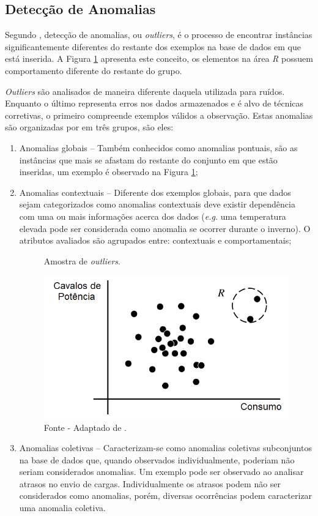 \subsection{Detecção de Anomalias}
\label{subsec:outliers}

Segundo , detecção de anomalias, ou \textit{outliers}, é o processo de encontrar instâncias significantemente diferentes do restante dos exemplos na base de dados em que está inserida. A Figura \ref{fig:outliers} apresenta este conceito, os elementos na área \textit{R} possuem comportamento diferente do restante do grupo.

\textit{Outliers} são analisados de maneira diferente daquela utilizada para ruídos. Enquanto o último representa erros nos dados armazenados e é alvo de técnicas corretivas, o primeiro compreende exemplos válidos a observação. Estas anomalias são organizadas por  em três grupos, são eles:

\begin{enumerate}[label=\roman*.]
    \item Anomalias globais {--} Também conhecidos como anomalias pontuais, são as instâncias que mais se afastam do restante do conjunto em que estão inseridas, um exemplo é observado na Figura \ref{fig:outliers};
    \item Anomalias contextuais {--} Diferente dos exemplos globais, para que dados sejam categorizados como anomalias contextuais deve existir dependência com uma ou mais informações acerca dos dados (\textit{e.g.} uma temperatura elevada pode ser considerada como anomalia se ocorrer durante o inverno). O atributos avaliados são agrupados entre: contextuais e comportamentais;
    
    \begin{figure}[H]
        \centering
        \caption{Amostra de \textit{outliers}.}
        \includegraphics[width=0.7\linewidth]{figuras/outliers.png}
        \caption*{Fonte - Adaptado de \cite{han2011data}.}
        \label{fig:outliers}
    \end{figure}
    
    \item Anomalias coletivas {--} Caracterizam\hyp{}se como anomalias coletivas subconjuntos na base de dados que, quando observados individualmente, poderiam não seriam considerados anomalias. Um exemplo pode ser observado ao analisar atrasos no envio de cargas. Individualmente os atrasos podem não ser considerados como anomalias, porém, diversas ocorrências podem caracterizar uma anomalia coletiva.
\end{enumerate}

